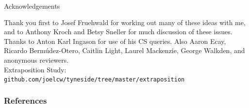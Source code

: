 \documentclass[hyperref={pdfpagelabels=false}]{beamer}
\begin{document}
\begin{frame}{Acknowledgements}
\begin{center}
Thank you first to Josef Fruehwald for working out many of these ideas with me, and to Anthony Kroch and Betsy Sneller for much discussion of these issues. Thanks to Anton Karl Ingason for use of his CS queries. Also Aaron Ecay, Ricardo Bermúdez-Otero, Caitlin Light, Laurel Mackenzie, George Walkden, and anonymous reviewers.
\vspace{5mm}\\
Extraposition Study: \texttt{github.com/joelcw/tyneside/tree/master/extraposition}
\end{center}
\end{frame}


\begin{frame}[allowframebreaks]
\frametitle{References}
\newcommand*{\newblock}{natbib}


\end{frame}
\end{document}
